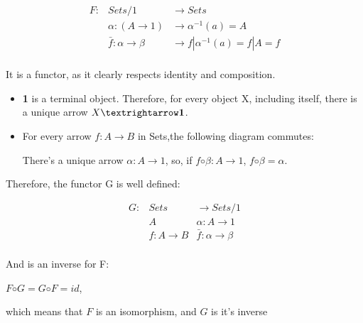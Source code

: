 \documentclass[notitlepage,a4paper]{article}
\begin{document}
\begin{enumerate}
    \begin{equation*}
    \begin{array}{rll}
      F : & Sets/1           & → Sets                   \\
          & α : (A → 1)      & → α^{-1}(a)   = A         \\
          & \bar{f} : α → β  & → f|α^{-1}(a) = f|A  = f  \\
    \end{array}
    \end{equation*}

    It is a functor, as it clearly respects identity and composition.

    \begin{itemize}
      \item {\bf 1} is a terminal object. Therefore, for every object X,
        including itself, there is a unique arrow $X → \text{\bf 1}$.
      \item For every arrow $f : A → B$ in Sets,the following diagram
        commutes:
        

     There's a unique arrow $α : A → 1$, so, if $f ◦ β : A → 1$,
     $f ◦ β = α$.

    \end{itemize}

    Therefore, the functor G is well defined:

    \begin{equation*}
    \begin{array}{rll}
      G : & Sets             & → Sets/1         \\
          & A                & α : A → 1  \\
          & f : A → B        & \bar{f} : α → β\\
    \end{array}
    \end{equation*}

    And is an inverse for F:

    $F ◦ G = G ◦ F = id$,

    which means that $F$ is an isomorphism, and $G$ is it's inverse
    

\end{enumerate}
\end{document}
